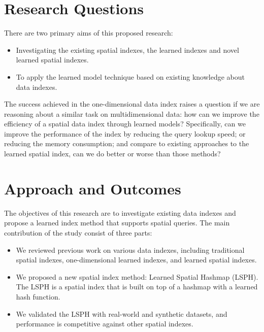 \section{Research Questions}
There are two primary aims of this proposed research: 
\begin{itemize}
\item Investigating the existing spatial indexes, the learned indexes and novel learned spatial indexes.
\item To apply the learned model technique based on existing knowledge about data indexes. 
\end{itemize}

The success achieved in the one-dimensional data index raises a question if we are reasoning about a similar task on multidimensional data: how can we improve the efficiency of a spatial data index through learned models? Specifically, can we improve the performance of the index by reducing the query lookup speed; or reducing the memory consumption; and compare to existing approaches to the learned spatial index, can we do better or worse than those methods? 


\section{Approach and Outcomes}

The objectives of this research are to investigate existing data indexes and propose a learned index method that supports spatial queries. The main contribution of the study consist of three parts:
\begin{itemize}
    \item We reviewed previous work on various data indexes, including traditional spatial indexes, one-dimensional learned indexes, and learned spatial indexes.
    \item We proposed a new spatial index method: Learned Spatial Hashmap (LSPH). The LSPH is a spatial index that is built on top of a hashmap with a learned hash function.  
    \item We validated the LSPH with real-world and synthetic datasets, and performance is competitive against other spatial indexes.
\end{itemize}

